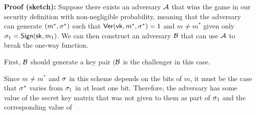 \textbf{Proof (sketch):} Suppose there exists an adversary $\mathcal{A}$ that wins the game in our security definition with non-negligible probability, meaning that the adversary can generate $(m^*, \sigma^*)$ such that $\mathsf{Ver}(\mathsf{vk}, m^*, \sigma^*) = 1$ and $m \neq m^*$ given only $\sigma_1 = \mathsf{Sign}({\mathsf{sk}}, m_1)$. We can then construct an adversary $\mathcal{B}$ that can use $\mathcal{A}$ to break the one-way function.

First, $\mathcal{B}$ should generate a key pair ($\mathcal{B}$ is the challenger in this case.

Since $m \neq m^*$ and $\sigma$ in this scheme depends on the bits of $m$, it must be the case that $\sigma^*$ varies from $\sigma_1$ in at least one bit. Therefore, the adversary has some value of the secret key matrix that was not given to them as part of $\sigma_1$ and the corresponding value of

